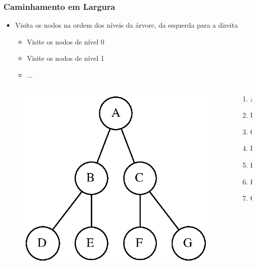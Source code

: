 \documentclass[aspectratio=169]{beamer}
\begin{document}
\begin{frame}\frametitle{Caminhamento em Largura}
\begin{itemize}
	\item Visita os nodos na ordem dos níveis da árvore, da esquerda para a direita
	\begin{itemize}
		\item Visite os nodos de nível 0
		\item Visite os nodos de nível 1
		\item ...
	\end{itemize}
\end{itemize}
\begin{columns}[T]
\begin{column}{0.7\linewidth}
\begin{figure}[h]
	\centering
	\includegraphics[height=0.4\paperheight]{imagens/arvore_binaria08.eps}
\end{figure}
\end{column}
\begin{column}{0.3\linewidth}
\pause
\begin{enumerate}
	\item A
	\item B
	\item C
	\item D
	\item E
	\item F
	\item G
\end{enumerate}
\end{column}
\end{columns}
\end{frame}
\end{document}

